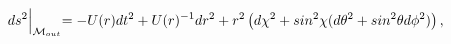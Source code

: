 \begin{equation}
\label{metric} ds^2\Bigl|_{{\cal
M}_{out}}=-U(r)dt^2+U(r)^{-1}dr^2+r^2\left(d\chi^2+sin^2\chi
(d\theta^2+ sin^2\theta d\phi^2)\right),
\end{equation}

